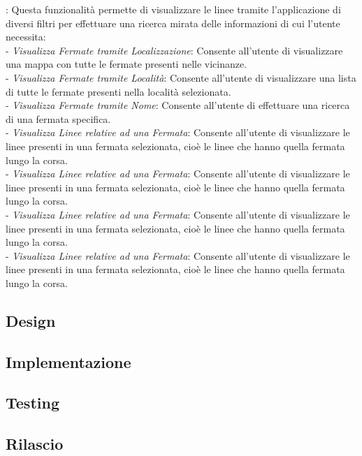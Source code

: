 : Questa funzionalit\`{a} permette di visualizzare le linee tramite l’applicazione di diversi filtri per effettuare una ricerca mirata delle informazioni di cui l’utente necessita:\\

 - \emph{Visualizza Fermate tramite Localizzazione}: Consente all’utente di visualizzare una mappa con tutte le fermate presenti nelle vicinanze.\\
 - \emph{Visualizza Fermate tramite Localit\`{a}}: Consente all’utente di visualizzare una lista di tutte le fermate presenti nella località selezionata.\\
 - \emph{Visualizza Fermate tramite Nome}: Consente all’utente di effettuare una ricerca di una fermata specifica.\\
 - \emph{Visualizza Linee relative ad una Fermata}: Consente all’utente di visualizzare le linee presenti in una fermata selezionata, cioè le linee che hanno quella fermata lungo la corsa.\\
 - \emph{Visualizza Linee relative ad una Fermata}: Consente all’utente di visualizzare le linee presenti in una fermata selezionata, cioè le linee che hanno quella fermata lungo la corsa.\\
 - \emph{Visualizza Linee relative ad una Fermata}: Consente all’utente di visualizzare le linee presenti in una fermata selezionata, cioè le linee che hanno quella fermata lungo la corsa.\\
 - \emph{Visualizza Linee relative ad una Fermata}: Consente all’utente di visualizzare le linee presenti in una fermata selezionata, cioè le linee che hanno quella fermata lungo la corsa.\\


\subsection{Design}

\subsection{Implementazione}

\subsection{Testing}

\subsection{Rilascio}